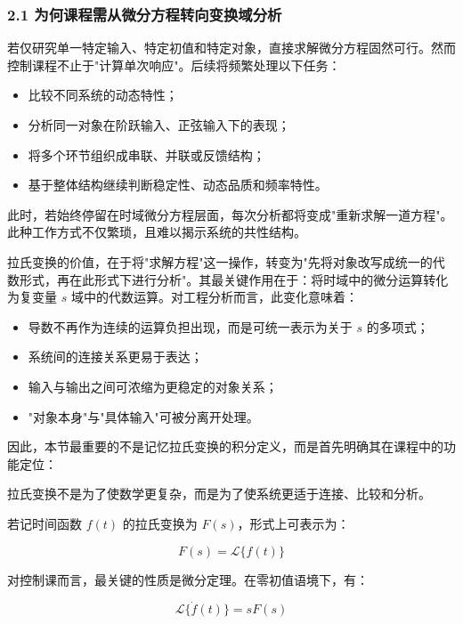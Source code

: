 \documentclass[
  11pt]{article}
\providecommand{\tightlist}{%
  \setlength{\itemsep}{0pt}\setlength{\parskip}{0pt}}
\renewenvironment{quote}
  {\begin{HandoutQuoteBox}\small\color{TitleBlue}\noindent\ignorespaces}
  {\end{HandoutQuoteBox}}
\begin{document}
\subsubsection{2.1
为何课程需从微分方程转向变换域分析}\label{ux4e3aux4f55ux8bfeux7a0bux9700ux4eceux5faeux5206ux65b9ux7a0bux8f6cux5411ux53d8ux6362ux57dfux5206ux6790}

若仅研究单一特定输入、特定初值和特定对象，直接求解微分方程固然可行。然而控制课程不止于"计算单次响应"。后续将频繁处理以下任务：

\begin{itemize}
\tightlist
\item
  比较不同系统的动态特性；
\item
  分析同一对象在阶跃输入、正弦输入下的表现；
\item
  将多个环节组织成串联、并联或反馈结构；
\item
  基于整体结构继续判断稳定性、动态品质和频率特性。
\end{itemize}

此时，若始终停留在时域微分方程层面，每次分析都将变成"重新求解一道方程"。此种工作方式不仅繁琐，且难以揭示系统的共性结构。

拉氏变换的价值，在于将"求解方程"这一操作，转变为"先将对象改写成统一的代数形式，再在此形式下进行分析"。其最关键作用在于：将时域中的微分运算转化为复变量
\(s\) 域中的代数运算。对工程分析而言，此变化意味着：

\begin{itemize}
\tightlist
\item
  导数不再作为连续的运算负担出现，而是可统一表示为关于 \(s\) 的多项式；
\item
  系统间的连接关系更易于表达；
\item
  输入与输出之间可浓缩为更稳定的对象关系；
\item
  "对象本身"与"具体输入"可被分离开处理。
\end{itemize}

因此，本节最重要的不是记忆拉氏变换的积分定义，而是首先明确其在课程中的功能定位：

\begin{quote}
拉氏变换不是为了使数学更复杂，而是为了使系统更适于连接、比较和分析。
\end{quote}

若记时间函数 \(f(t)\) 的拉氏变换为 \(F(s)\)，形式上可表示为：

\[
F(s)=\mathcal{L}\{f(t)\}
\]

对控制课而言，最关键的性质是微分定理。在零初值语境下，有：

\[
\mathcal{L}\{\dot f(t)\}=sF(s)
\]
\end{document}

